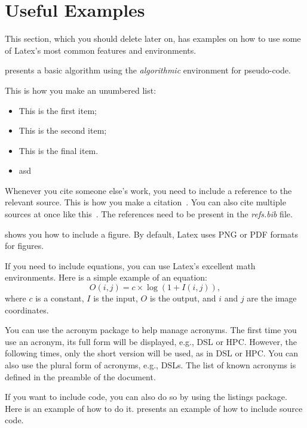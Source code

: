 \documentclass[sigconf,balance,nonacm,authordraft]{acmart}
\begin{document}
\section{Useful Examples}
\label{sec:examples}
This section, which you should delete later on, has examples on how to use some of Latex's most common features and environments.



 presents a basic algorithm using the \textit{algorithmic} environment for pseudo-code.

This is how you make an unumbered list:
\begin{itemize}
    \item This is the first item;
    \item This is the second item;
    \item This is the final item.
    \item asd
\end{itemize}

Whenever you cite someone else's work, you need to include a reference to the relevant source. This is how you make a citation~\cite{Michie1968}. You can also cite multiple sources at once like this~\cite{Strachey2000,Connors2000}. The references need to be present in the \textit{refs.bib} file.



 shows you how to include a figure. By default, Latex uses PNG or PDF formats for figures.

If you need to include equations, you can use Latex's excellent math environments. Here is a simple example of an equation:
\begin{equation}\label{eq:log}
    O(i, j) = c \times \log{(1+I(i, j))},
\end{equation}
where $c$ is a constant, $I$ is the input, $O$ is the output, and $i$ and $j$ are the image coordinates.

You can use the acronym package to help manage acronyms. The first time you use an acronym, its full form will be displayed, e.g., \ac{DSL} or \ac{HPC}. However, the following times, only the short version will be used, as in \ac{DSL} or \ac{HPC}. You can also use the plural form of acronyms, e.g., \acp{DSL}. The list of known acronyms is defined in the preamble of the document.



If you want to include code, you can also do so by using the listings package. Here is an example of how to do it.  presents an example of how to include source code.
\end{document}
